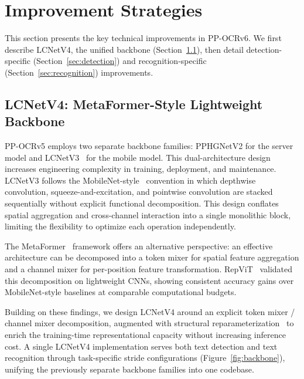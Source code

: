 \documentclass[11pt, a4paper,logo,  copyright, nonumbering]{paddleocr}
\begin{document}

\section{Improvement Strategies}

This section presents the key technical improvements in PP-OCRv6. We first describe LCNetV4, the unified backbone (Section~\ref{sec:backbone}), then detail detection-specific (Section~\ref{sec:detection}) and recognition-specific (Section~\ref{sec:recognition}) improvements.

\subsection{LCNetV4: MetaFormer-Style Lightweight Backbone}
\label{sec:backbone}

PP-OCRv5 employs two separate backbone families: PPHGNetV2 for the server model and LCNetV3~\cite{cui2021pp} for the mobile model. This dual-architecture design increases engineering complexity in training, deployment, and maintenance. LCNetV3 follows the MobileNet-style~\cite{sandler2018mobilenetv2} convention in which depthwise convolution, squeeze-and-excitation, and pointwise convolution are stacked sequentially without explicit functional decomposition. This design conflates spatial aggregation and cross-channel interaction into a single monolithic block, limiting the flexibility to optimize each operation independently.

The MetaFormer~\cite{yu2022metaformer} framework offers an alternative perspective: an effective architecture can be decomposed into a token mixer for spatial feature aggregation and a channel mixer for per-position feature transformation. RepViT~\cite{wang2024repvit} validated this decomposition on lightweight CNNs, showing consistent accuracy gains over MobileNet-style baselines at comparable computational budgets.

Building on these findings, we design LCNetV4 around an explicit token mixer / channel mixer decomposition, augmented with structural reparameterization~\cite{ding2021repvgg} to enrich the training-time representational capacity without increasing inference cost. A single LCNetV4 implementation serves both text detection and text recognition through task-specific stride configurations (Figure~\ref{fig:backbone}), unifying the previously separate backbone families into one codebase.
\end{document}
